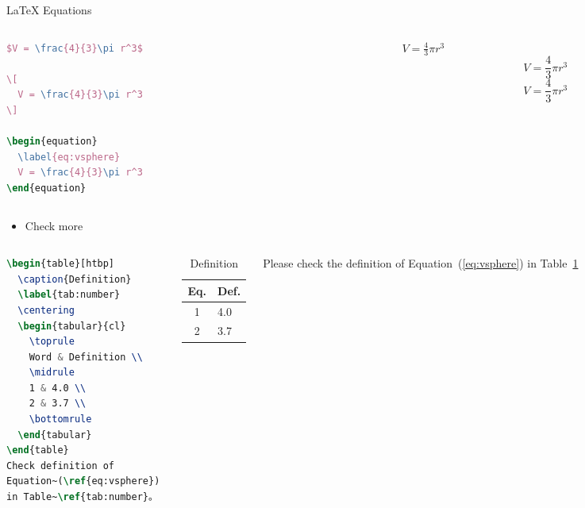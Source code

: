 \documentclass{beamer}
\begin{document}
\begin{frame}[fragile]{\LaTeX{} Equations}
    \begin{columns}
        \begin{column}{.55\textwidth}
\begin{lstlisting}[language=TeX]
$V = \frac{4}{3}\pi r^3$

\[
  V = \frac{4}{3}\pi r^3
\]

\begin{equation}
  \label{eq:vsphere}
  V = \frac{4}{3}\pi r^3
\end{equation}
\end{lstlisting}
        \end{column}
        \begin{column}{.4\textwidth}
            $V = \frac{4}{3}\pi r^3$
            \[
                V = \frac{4}{3}\pi r^3
            \]
            \begin{equation}
                \label{eq:vsphere}
                V = \frac{4}{3}\pi r^3
            \end{equation}
        \end{column}
    \end{columns}
    \begin{itemize}
        \item Check more \href{https://en.wikipedia.org/wiki/Help:Displaying_a_formula}{\color{purple}{Here}}
    \end{itemize}
\end{frame}

\begin{frame}[fragile]
    \begin{columns}
\begin{lstlisting}[language=TeX]
\begin{table}[htbp]
  \caption{Definition}
  \label{tab:number}
  \centering
  \begin{tabular}{cl}
    \toprule
    Word & Definition \\
    \midrule
    1 & 4.0 \\
    2 & 3.7 \\
    \bottomrule
  \end{tabular}
\end{table}
Check definition of 
Equation~(\ref{eq:vsphere}) 
in Table~\ref{tab:number}。
\end{lstlisting}
        \begin{table}[htpb]
            \centering
            \caption{Definition}
            \label{tab:number}
            \begin{tabular}{cl}\toprule
                Eq. & Def. \\\midrule
                1 & 4.0\\
                2 & 3.7\\\bottomrule
            \end{tabular}
        \end{table}
        \normalsize Please check the definition of Equation~(\ref{eq:vsphere}) in Table~\ref{tab:number}
    \end{columns}
\end{frame}
\end{document}
